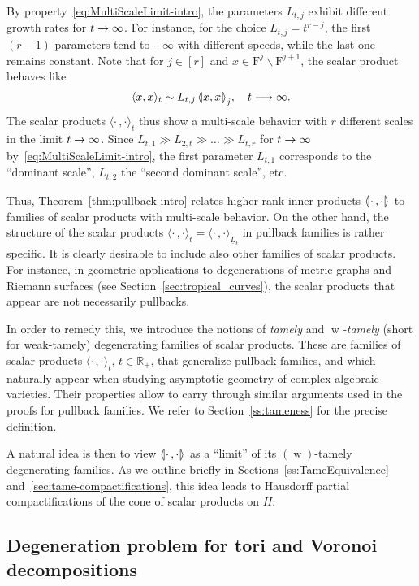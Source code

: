 \documentclass[AHL,Unicode,longabstracts]{cedram}
\newcommand{\innone}[2]{{\langle#2\rangle_{#1}}}
\newcommand{\llangle}{\mathopen{\langle\mkern -3.1mu\lvert}}
\newcommand{\rrangle}{\mathclose{\rvert\mkern -3.1mu\rangle}}
\newcommand{\highinn}[2]{{\llangle#2\rrangle_{#1}}}
\DeclareMathOperator{\weak}{w}
\newcommand{\filter}{\mathrm{F}}
\newcommand{\R}{\mathbb{R}}
\renewcommand{\setminus}{\smallsetminus}
\renewcommand*{\to}{\mathchoice{\longrightarrow}{\rightarrow}{\rightarrow}{\rightarrow}}
\begin{document}
By property~\eqref{eq:MultiScaleLimit-intro}, the parameters $L_{t,j}$ exhibit different growth rates for $t \to \infty$. For instance, for the choice $L_{t,j} = t^{r-j}$, the first $(r-1)$ parameters tend to $+\infty$ with different speeds, while the last one remains constant. Note that for $j \in [r]$ and $x \in \filter^j\setminus \filter^{j+1}$, the scalar product behaves like
\[
\innone{t}{x,x} \sim L_{t,j} \, \highinn{j}{x,x}, \quad t \to \infty.
\]
The scalar products $\innone{t}{\cdot \,, \cdot}$ thus show a multi-scale behavior with $r$ different scales in the limit $t \to \infty$. Since $L_{t,1} \gg L_{2,t} \gg \dots \gg L_{t,r}$ for $t \to \infty$ by~\eqref{eq:MultiScaleLimit-intro}, the first parameter $L_{t,1}$ corresponds to the ``dominant scale'', $L_{t,2}$ the ``second dominant scale'', etc.



Thus, Theorem~\ref{thm:pullback-intro} relates higher rank inner products $\highinn{}{\cdot\,, \cdot}$ to families of scalar products with multi-scale behavior. On the other hand, the structure of the scalar products $\innone{t}{\cdot \,, \cdot} = \innone{\underline L_t}{\cdot \,, \cdot}$ in pullback families is rather specific. It is clearly desirable to include also other families of scalar products. For instance, in geometric applications to degenerations of metric graphs and Riemann surfaces (see Section~\ref{sec:tropical_curves}), the scalar products that appear are not necessarily pullbacks.



In order to remedy this, we introduce the notions of \emph{tamely} and \emph{$\weak$-tamely} (short for weak-tamely) degenerating families of scalar products. These are families of scalar products $\innone{t}{\cdot \,, \cdot}$, $t \in \R_+$, that generalize pullback families, and which naturally appear when studying asymptotic geometry of complex algebraic varieties. Their properties allow to carry through similar arguments used in the proofs for pullback families. We refer to Section~\ref{ss:tameness} for the precise definition.

A natural idea is then to view $\highinn{}{\cdot\,, \cdot}$ as a ``limit'' of its $(\weak)$-tamely degenerating families. As we outline briefly in Sections~\ref{ss:TameEquivalence} and~\ref{sec:tame-compactifications}, this idea leads to Hausdorff partial compactifications of the cone of scalar products on $H$.


\subsection{Degeneration problem for tori and Voronoi decompositions}
\end{document}
